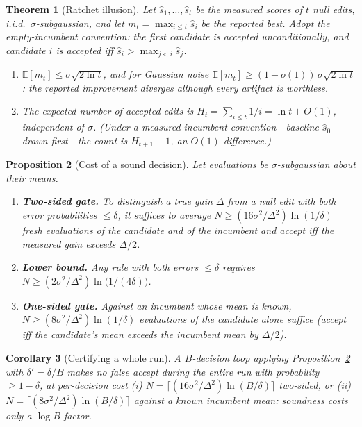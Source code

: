 \documentclass{article}
\theoremstyle{plain}
\newtheorem{theorem}{Theorem}[section]
\newtheorem{proposition}[theorem]{Proposition}
\newtheorem{corollary}[theorem]{Corollary}
\theoremstyle{definition}
\theoremstyle{remark}
\newcommand{\E}{\mathbb{E}}
\begin{document}
\begin{theorem}[Ratchet illusion]
\label{thm:ratchet}
Let $\hat{s}_1, \dots, \hat{s}_t$ be the measured scores of $t$ null edits, i.i.d.\ $\sigma$-subgaussian, and let $m_t = \max_{i \le t} \hat{s}_i$ be the reported best. Adopt the \emph{empty-incumbent} convention: the first candidate is accepted unconditionally, and candidate $i$ is accepted iff $\hat{s}_i > \max_{j<i} \hat{s}_j$.
\begin{enumerate}\itemsep1pt
\item[(i)] $\E[m_t] \le \sigma\sqrt{2 \ln t}$, and for Gaussian noise $\E[m_t] \ge (1 - o(1))\,\sigma\sqrt{2\ln t}$: the reported improvement diverges although every artifact is worthless.
\item[(ii)] The expected number of accepted edits is $H_t = \sum_{i \le t} 1/i = \ln t + O(1)$, independent of $\sigma$. (Under a \emph{measured-incumbent} convention---baseline $\hat{s}_0$ drawn first---the count is $H_{t+1} - 1$, an $O(1)$ difference.)
\end{enumerate}
\end{theorem}

\begin{proposition}[Cost of a sound decision]
\label{prop:repeats}
Let evaluations be $\sigma$-subgaussian about their means.
\begin{enumerate}\itemsep1pt
\item[(i)] \textbf{Two-sided gate.} To distinguish a true gain $\Delta$ from a null edit with both error probabilities $\le \delta$, it suffices to average $N \ge (16\sigma^2/\Delta^2)\ln(1/\delta)$ fresh evaluations of the candidate and of the incumbent and accept iff the measured gain exceeds $\Delta/2$.
\item[(ii)] \textbf{Lower bound.} Any rule with both errors $\le \delta$ requires $N \ge (2\sigma^2/\Delta^2)\ln\!\big(1/(4\delta)\big)$.
\item[(iii)] \textbf{One-sided gate.} Against an incumbent whose mean is known, $N \ge (8\sigma^2/\Delta^2)\ln(1/\delta)$ evaluations of the candidate alone suffice (accept iff the candidate's mean exceeds the incumbent mean by $\Delta/2$).
\end{enumerate}
\end{proposition}

\begin{corollary}[Certifying a whole run]
\label{cor:budget}
A $B$-decision loop applying Proposition~\ref{prop:repeats} with $\delta' = \delta/B$ makes no false accept during the entire run with probability $\ge 1 - \delta$, at per-decision cost (i) $N = \lceil (16\sigma^2/\Delta^2) \ln(B/\delta) \rceil$ two-sided, or (ii) $N = \lceil (8\sigma^2/\Delta^2) \ln(B/\delta) \rceil$ against a known incumbent mean: soundness costs only a $\log B$ factor.
\end{corollary}
\end{document}

